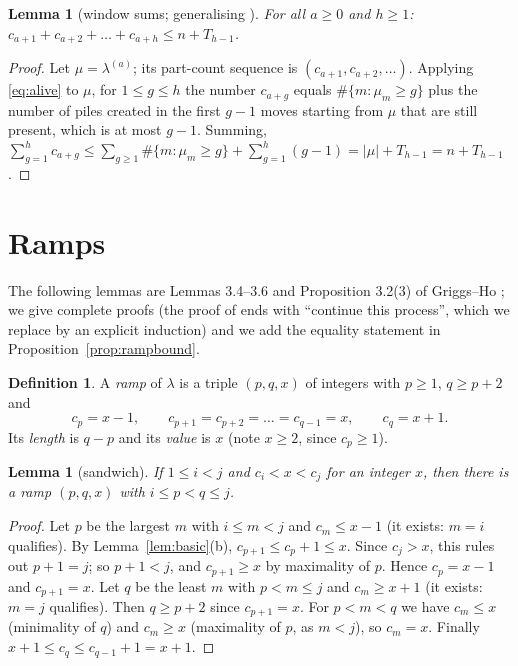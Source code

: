\documentclass[11pt]{article}
\newtheorem{lemma}[theorem]{Lemma}
\theoremstyle{definition}
\newtheorem{definition}[theorem]{Definition}
\renewcommand{\le}{\leqslant}
\renewcommand{\ge}{\geqslant}
\begin{document}
\begin{lemma}[window sums; generalising {\cite[Prop.~3.2(2)]{GH}}]\label{lem:window}
For all $a\ge0$ and $h\ge1$: $c_{a+1}+c_{a+2}+\dots+c_{a+h}\le n+T_{h-1}$.
\end{lemma}
\begin{proof}
Let $\mu=\lambda^{(a)}$; its part-count sequence is $(c_{a+1},c_{a+2},\dots)$.  Applying \eqref{eq:alive} to $\mu$,
for $1\le g\le h$ the number $c_{a+g}$ equals $\#\{m:\mu_m\ge g\}$ plus the number of piles created in the
first $g-1$ moves starting from $\mu$ that are still present, which is at most $g-1$.  Summing,
$\sum_{g=1}^h c_{a+g}\le\sum_{g\ge1}\#\{m:\mu_m\ge g\}+\sum_{g=1}^h(g-1)=|\mu|+T_{h-1}=n+T_{h-1}$.
\end{proof}

\section{Ramps}\label{sec:ramps}

The following lemmas are Lemmas 3.4--3.6 and Proposition 3.2(3) of Griggs--Ho \cite{GH}; we give complete
proofs (the proof of \cite[Lemma~3.5]{GH} ends with ``continue this process'', which we replace by an
explicit induction) and we add the equality statement in Proposition~\ref{prop:rampbound}.

\begin{definition}
A \emph{ramp} of $\lambda$ is a triple $(p,q,x)$ of integers with $p\ge1$, $q\ge p+2$ and
\[c_p=x-1,\qquad c_{p+1}=c_{p+2}=\dots=c_{q-1}=x,\qquad c_q=x+1 .\]
Its \emph{length} is $q-p$ and its \emph{value} is $x$ (note $x\ge2$, since $c_p\ge1$).
\end{definition}

\begin{lemma}[sandwich]\label{lem:sandwich}
If $1\le i<j$ and $c_i<x<c_j$ for an integer $x$, then there is a ramp $(p,q,x)$ with $i\le p<q\le j$.
\end{lemma}
\begin{proof}
Let $p$ be the largest $m$ with $i\le m<j$ and $c_m\le x-1$ (it exists: $m=i$ qualifies).  By
Lemma~\ref{lem:basic}(b), $c_{p+1}\le c_p+1\le x$.  Since $c_j>x$, this rules out $p+1=j$; so $p+1<j$, and
$c_{p+1}\ge x$ by maximality of $p$.  Hence $c_p=x-1$ and $c_{p+1}=x$.  Let $q$ be the least $m$ with $p<m\le j$ and
$c_m\ge x+1$ (it exists: $m=j$ qualifies).  Then $q\ge p+2$ since $c_{p+1}=x$.  For $p<m<q$ we have $c_m\le x$
(minimality of $q$) and $c_m\ge x$ (maximality of $p$, as $m<j$), so $c_m=x$.  Finally
$x+1\le c_q\le c_{q-1}+1=x+1$.
\end{proof}
\end{document}
